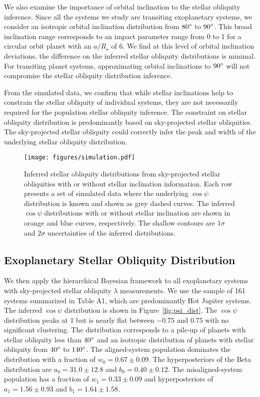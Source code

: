 \documentclass[twocolumn,times]{aastex631}
\begin{document}
We also examine the importance of orbital inclination to the stellar obliquity inference. Since all the systems we study are transiting exoplanetary systems, we consider an isotropic orbital inclination distribution from $80\mbox{$^\circ$}$ to $90\mbox{$^\circ$}$. This broad inclination range corresponds to an impact parameter range from 0 to 1 for a circular orbit planet with an $a/R_\star$ of 6. We find at this level of orbital inclination deviations, the difference on the inferred stellar obliquity distributions is minimal. For transiting planet systems, approximating orbital inclinations to $90\mbox{$^\circ$}$ will not compromise the stellar obliquity distribution inference.

From the simulated data, we confirm that while stellar inclinations help to constrain the stellar obliquity of individual systems, they are not necessarily required for the population stellar obliquity inference. The constraint on stellar obliquity distribution is predominantly based on sky-projected stellar obliquities. The sky-projected stellar obliquity could correctly infer the peak and width of the underlying stellar obliquity distribution.

\begin{figure}[ht!]
    \texttt{[image: figures/simulation.pdf]}
    \caption{Inferred stellar obliquity distributions from sky-projected stellar obliquities with or without stellar inclination information. Each row presents a set of simulated data where the underlying $\cos{\psi}$ distribution is known and shown as grey dashed curves. The inferred $\cos{\psi}$ distributions with or without stellar inclination are shown in orange and blue curves, respectively. The shallow contours are $1\sigma$ and $2\sigma$ uncertainties of the inferred distributions.}
    \label{fig:simulation}
\end{figure}

\subsection{Exoplanetary Stellar Obliquity Distribution}

We then apply the hierarchical Bayesian framework to all exoplanetary systems with sky-projected stellar obliquity $\lambda$ measurements. We use the sample of 161 systems summarized in \cite{Albrecht22} Table A1, which are predominantly Hot Jupiter systems. The inferred $\cos{\psi}$ distribution is shown in Figure~\ref{fig:psi_dist}. The $\cos{\psi}$ distribution peaks at 1 but is nearly flat between $-0.75$ and $0.75$ with no significant clustering. The distribution corresponds to a pile-up of planets with stellar obliquity less than $40\mbox{$^\circ$}$ and an isotropic distribution of planets with stellar obliquity from $40\mbox{$^\circ$}$ to $140\mbox{$^\circ$}$. 
The aligned-system population dominates the distribution with a fraction of $w_0 = 0.67 \pm 0.09$. The hyperposteriors of the Beta distribution are $a_0 = 31.0\pm12.8$ and $b_0 = 0.40\pm0.12$.
The misaligned-system population has a fraction of $w_1 = 0.33 \pm 0.09$ and hyperposteriors of $a_1 = 1.56\pm0.93$ and $b_1 = 1.64\pm1.58$.
\end{document}
